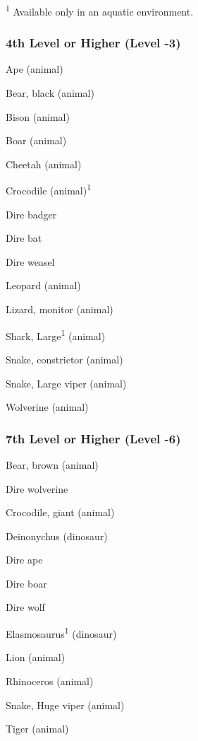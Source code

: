 \textsuperscript{1} Available only in an aquatic environment.

\subsubsection{4th Level or Higher (Level -3)}

\begin{itemize*}
\item Ape (animal) 
\item Bear, black (animal) 
\item Bison (animal)
\item Boar (animal) 
\item Cheetah (animal) 
\item Crocodile (animal)\textsuperscript{1}
\item Dire badger 
\item Dire bat
\item Dire weasel
\item Leopard (animal)
\item Lizard, monitor (animal)
\item Shark, Large\textsuperscript{1} (animal)
\item Snake, constrictor (animal)
\item Snake, Large viper (animal)
\item Wolverine (animal)
\end{itemize*}

\subsubsection{7th Level or Higher (Level -6)}

\begin{itemize*}
\item Bear, brown (animal) 
\item Dire wolverine
\item Crocodile, giant (animal) 
\item Deinonychus (dinosaur) 
\item Dire ape 
\item Dire boar 
\item Dire wolf 
\item Elasmosaurus\textsuperscript{1} (dinosaur)
\item Lion (animal)
\item Rhinoceros (animal)
\item Snake, Huge viper (animal)
\item Tiger (animal)
\end{itemize*}


